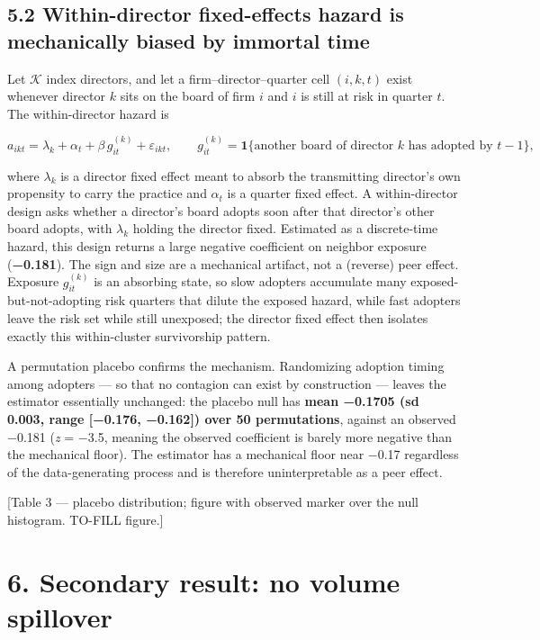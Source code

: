 \documentclass[
  a4paper,
]{article}
\begin{document}
\subsection{5.2 Within-director fixed-effects hazard is mechanically
biased by immortal
time}\label{within-director-fixed-effects-hazard-is-mechanically-biased-by-immortal-time}

Let \(\mathcal{K}\) index directors, and let a firm--director--quarter
cell \((i, k, t)\) exist whenever director \(k\) sits on the board of
firm \(i\) and \(i\) is still at risk in quarter \(t\). The
within-director hazard is

\[ a_{ikt} = \lambda_k + \alpha_t + \beta\, g^{(k)}_{it} + \varepsilon_{ikt}, \qquad g^{(k)}_{it} = \mathbf{1}\{\text{another board of director } k \text{ has adopted by } t-1\}, \]

where \(\lambda_k\) is a director fixed effect meant to absorb the
transmitting director's own propensity to carry the practice and
\(\alpha_t\) is a quarter fixed effect. A within-director design asks
whether a director's board adopts soon after that director's other board
adopts, with \(\lambda_k\) holding the director fixed. Estimated as a
discrete-time hazard, this design returns a large negative coefficient
on neighbor exposure (\textbf{−0.181}). The sign and size are a
mechanical artifact, not a (reverse) peer effect. Exposure
\(g^{(k)}_{it}\) is an absorbing state, so slow adopters accumulate many
exposed-but-not-adopting risk quarters that dilute the exposed hazard,
while fast adopters leave the risk set while still unexposed; the
director fixed effect then isolates exactly this within-cluster
survivorship pattern.

A permutation placebo confirms the mechanism. Randomizing adoption
timing among adopters --- so that no contagion can exist by construction
--- leaves the estimator essentially unchanged: the placebo null has
\textbf{mean −0.1705 (sd 0.003, range {[}−0.176, −0.162{]}) over 50
permutations}, against an observed −0.181 (\emph{z} = −3.5, meaning the
observed coefficient is barely more negative than the mechanical floor).
The estimator has a mechanical floor near −0.17 regardless of the
data-generating process and is therefore uninterpretable as a peer
effect.

{[}Table 3 --- placebo distribution; figure with observed marker over
the null histogram. TO-FILL figure.{]}

\section{6. Secondary result: no volume
spillover}\label{secondary-result-no-volume-spillover}
\end{document}
